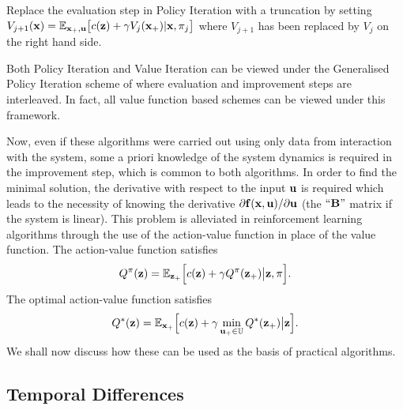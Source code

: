 \begin{algo} \label{algo:valit}
Replace the evaluation step in Policy Iteration with a truncation by setting $V_{j+1}(\mathbf{x}) = \mathbb{E}_{\mathbf{x}_+,\mathbf{u}} \big[c(\mathbf{z}) + \gamma V_{j}(\mathbf{x}_+) |\mathbf{x},\pi_j\big]$ where $V_{j+1}$ has been replaced by $V_j$ on the right hand side.
\end{algo}

Both Policy Iteration and Value Iteration can be viewed under the Generalised Policy Iteration scheme of \cite{SuBa98} where evaluation and improvement steps are interleaved. In fact, all value function based schemes can be viewed under this framework.



Now, even if these algorithms were carried out using only data from interaction with the system, some a priori knowledge of the system dynamics is required in the improvement step, which is common to both algorithms. In order to find the minimal solution, the derivative with respect to the input $\mathbf{u}$ is required which leads to the necessity of knowing the derivative $\partial\mathbf{f}(\mathbf{x},\mathbf{u})/\partial\mathbf{u}$ (the $``\mathbf{B}"$ matrix if the system is linear). This problem is alleviated in reinforcement learning algorithms through the use of the action-value function in place of the value function. 
The action-value function satisfies
\begin{equation}
Q^\pi(\mathbf{z}) = \mathbb{E}_{\mathbf{z}_+} \Big[ c(\mathbf{z}) + \gamma Q^\pi(\mathbf{z}_+) \big|\mathbf{z},\pi \Big]. \label{eqn:Qfixed}
\end{equation}
The optimal action-value function satisfies
\begin{equation*}
Q^*(\mathbf{z}) = \mathbb{E}_{\mathbf{x}_+} \Big[ c(\mathbf{z}) + \gamma \min_{\mathbf{u}_+\in\mathbb{U}}Q^*(\mathbf{z}_+) \big|\mathbf{z} \Big].
\end{equation*}
We shall now discuss how these can be used as the basis of practical algorithms.



\subsection{Temporal Differences}
